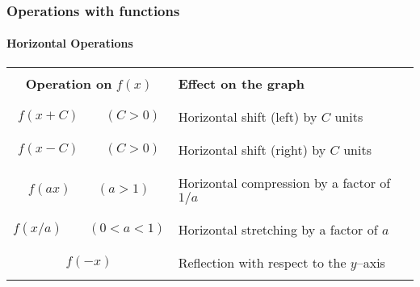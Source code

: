 \documentclass[9pt,xcolor=x11names,compress]{beamer}
\begin{document}
\begin{frame}\frametitle{Operations with functions}
\framesubtitle{Horizontal Operations}
\begin{center}
   \begin{tabular}{c||l} 
   \rowcolor{DeepSkyBlue4} &\\
   \rowcolor{DeepSkyBlue4}
   \textbf{Operation on }$f(x)$ & \textbf{Effect on the graph} \\
   \rowcolor{DeepSkyBlue4} & \pause \\ 
   & \\ $f(x+C)\qquad (C>0)$ & Horizontal shift (\alert{left}) by $C$ units \\
   & \pause \\ 
   \rowcolor{white} &\\ \rowcolor{white}
   $f(x-C)\qquad (C>0)$ & Horizontal shift (\alert{right}) by $C$ units \\
   \rowcolor{white} & \pause \\ 
   &\\ $f(ax)\qquad (a>1)$ & Horizontal compression by a factor of $1/a$ \\
   & \pause \\ 
   \rowcolor{white} &\\
   \rowcolor{white}
   $f(x/a)\qquad (0<a<1)$ & Horizontal stretching by a factor of $a$ \\
   \rowcolor{white} & \pause \\ 
   &\\ $f(-x)$ & Reflection with respect to the $y$--axis  \\ & \\
   \end{tabular}
   \end{center}
\end{frame}
\end{document}
